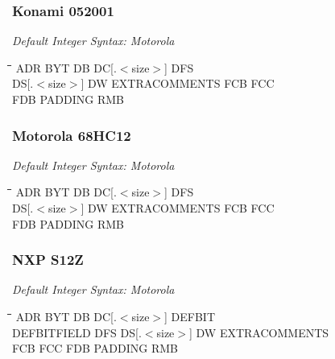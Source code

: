 \subsubsection{Konami 052001}

{\em Default Integer Syntax: Motorola}

{\tt\begin{tabbing}
\hspace{3cm}\=\hspace{3cm}\=\hspace{3cm}\=\hspace{3cm}\=\kill
ADR        \> BYT         \> DB          \> DC[.$<$size$>$] DFS \\
DS[.$<$size$>$] \> DW     \> EXTRACOMMENTS \> FCB         \> FCC \\
FDB        \> PADDING     \> RMB \\
\end{tabbing}}

\subsubsection{Motorola 68HC12}

{\em Default Integer Syntax: Motorola}

{\tt\begin{tabbing}
\hspace{3cm}\=\hspace{3cm}\=\hspace{3cm}\=\hspace{3cm}\=\kill
ADR        \> BYT         \> DB          \> DC[.$<$size$>$] \> DFS \\
DS[.$<$size$>$] DW        \> EXTRACOMMENTS \> FCB           \> FCC \\
FDB        \> PADDING     \> RMB \\
\end{tabbing}}

\subsubsection{NXP S12Z}

{\em Default Integer Syntax: Motorola}

{\tt\begin{tabbing}
\hspace{3cm}\=\hspace{3cm}\=\hspace{3cm}\=\hspace{3cm}\=\kill
ADR        \> BYT         \> DB          \> DC[.$<$size$>$] \> DEFBIT \\
DEFBITFIELD \> DFS        \> DS[.$<$size$>$] \> DW          \> EXTRACOMMENTS \\
FCB        \> FCC         \> FDB         \> PADDING         \> RMB \\
\end{tabbing}}

